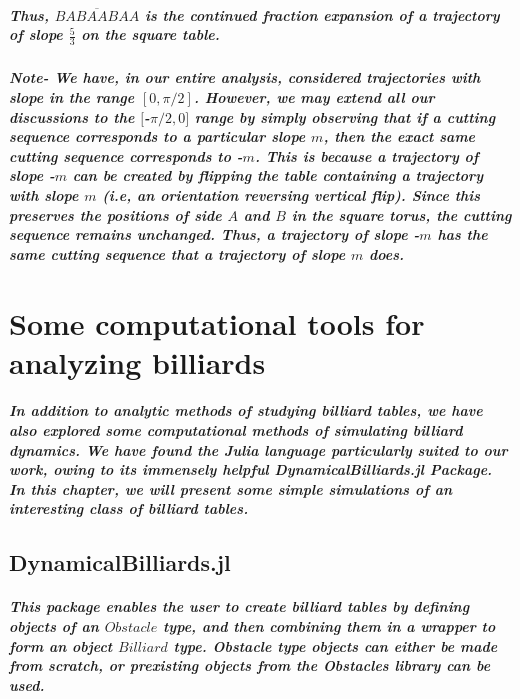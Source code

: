 \documentclass{report}
\begin{document}
\paragraph{Thus, $\overline{BABAABAA}$ is the continued fraction expansion of a trajectory of slope $\frac{5}{3}$ on the square table.}


\paragraph{Note- We have, in our entire analysis, considered trajectories with slope in the range $[0, \pi/2]$. However, we may extend all our discussions to the $[$-$\pi/2, 0]$ range by simply observing that if a cutting sequence corresponds to a particular slope $m$, then the exact same cutting sequence corresponds to -$m$. This is because a trajectory of slope -$m$ can be created by flipping the table containing a trajectory with slope $m$ (i.e, an orientation reversing vertical flip). Since this preserves the positions of side $A$ and $B$ in the square torus, the cutting sequence remains unchanged. Thus, a trajectory of slope -$m$ has the same cutting sequence that a trajectory of slope $m$ does.}



\chapter{Some computational tools for analyzing billiards}

\paragraph{In addition to analytic methods of studying billiard tables, we have also explored some computational methods of simulating billiard dynamics. We have found the Julia language particularly suited to our work, owing to its immensely helpful DynamicalBilliards.jl Package. In this chapter, we will present some simple simulations of an interesting class of billiard tables. }


\section{DynamicalBilliards.jl}

\paragraph{This package enables the user to create billiard tables by defining objects of an $Obstacle$ type, and then combining them in a wrapper to form an object $Billiard$ type. Obstacle type objects can either be made from scratch, or prexisting objects from the Obstacles library can be used.}
\end{document}
